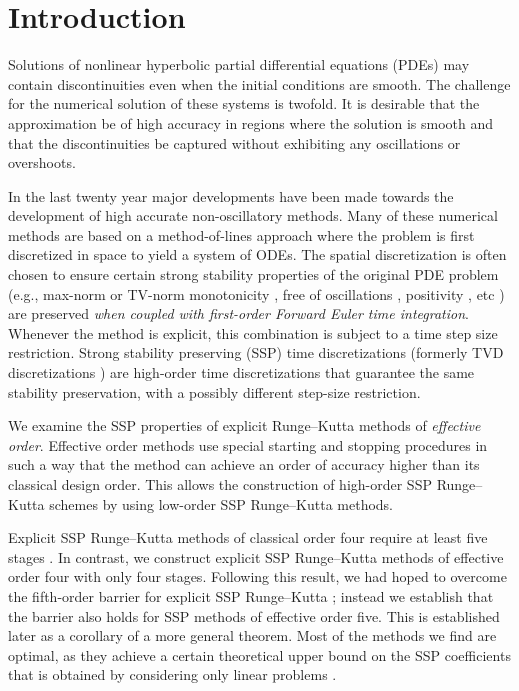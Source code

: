 \section{Introduction}\label{sec:Intro}
Solutions of nonlinear hyperbolic partial differential equations (PDEs) may 
contain discontinuities even when the initial conditions are smooth.
The challenge for the numerical solution of these systems is twofold. 
It is desirable that the approximation be of high accuracy in regions where 
the solution is smooth and that the discontinuities be captured without 
exhibiting any oscillations or overshoots. 

In the last twenty year major developments have been made towards the 
development of high accurate non-oscillatory methods. 
Many of these numerical methods are based on a method-of-lines approach 
where the problem is first discretized in space to yield a system of ODEs. 
The spatial discretization is often chosen to ensure certain strong stability 
properties of the original PDE problem (e.g., max-norm or TV-norm monotonicity \cite{Gottlieb/Ketcheson/Shu:2009}, 
free of oscillations \cite{Shu/Osher:1988}, positivity \cite{Horvath:2005}, etc ) are preserved 
\emph{when coupled with first-order Forward Euler time integration}.
Whenever the method is explicit, this combination is subject to a time step size restriction. 
 
Strong stability preserving (SSP) time discretizations (formerly TVD
discretizations \cite{Gottlieb/Shu:1998}) are high-order time
discretizations that guarantee the same stability preservation, with a
possibly different step-size restriction.

We examine the SSP properties of explicit Runge--Kutta methods of 
\emph{effective order}. 
Effective order methods use special starting and stopping procedures
in such a way that the method can achieve an order of
accuracy higher than its classical design order.
This allows the construction of high-order SSP Runge--Kutta schemes by
using low-order SSP Runge--Kutta methods.

Explicit SSP Runge--Kutta methods of classical order four require at 
least five stages \cite{Gottlieb/Shu:1998}. 
In contrast, we construct explicit SSP Runge--Kutta methods
of effective order four with only four stages.
Following this result, we had hoped to overcome the fifth-order
barrier for explicit SSP Runge--Kutta \cite{Ruuth2002}; instead we
establish that the barrier also holds for SSP methods of effective
order five.
This is established later as a corollary of a more general theorem.
Most of the methods we find are optimal, as they achieve a certain theoretical
upper bound on the SSP coefficients that is obtained by considering only
linear problems \cite{Kraaijevanger1986}.

